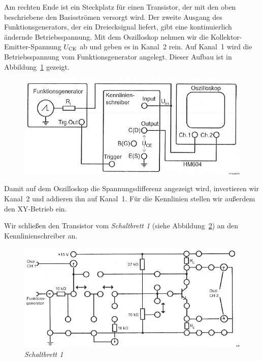Am rechten Ende ist ein Steckplatz für einen Transistor, der mit den oben
beschriebene den Basisströmen versorgt wird. Der zweite Ausgang des
Funktionsgenerators, der ein Dreiecksignal liefert, gibt eine kontinuierlich
ändernde Betriebsspannung. Mit dem Oszilloskop nehmen wir die
Kollektor-Emitter-Spannung $U_\text{CE}$ ab und geben es in Kanal~2 rein. Auf Kanal~1
wird die Betriebsspannung vom Funktionsgenerator angelegt. Dieser Aufbau ist in
Abbildung~\ref{fig:3-2} gezeigt.

\begin{figure}[htbp]
	\centering
	\includegraphics[width=\textwidth]{Anleitung/3-2.png}
	\caption{
		\cite[Abbildung~3.2]{physik313-Anleitung}
	}
	\label{fig:3-2}
\end{figure}

Damit auf dem Oszilloskop die Spannungsdifferenz angezeigt wird, invertieren
wir Kanal~2 und addieren ihn auf Kanal~1. Für die Kennlinien stellen wir
außerdem den XY-Betrieb ein.

Wir schließen den Transistor vom \emph{Schaltbrett 1} (siehe
Abbildung~\ref{fig:3-4}) an den Kennlinienschreiber an.

\begin{figure}[htbp]
	\centering
	\includegraphics[width=\textwidth]{Anleitung/3-4.png}
	\caption{
		\emph{Schaltbrett 1} \cite[Abbildung~3.4]{physik313-Anleitung}
	}
	\label{fig:3-4}
\end{figure}

